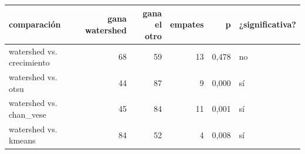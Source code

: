 \begin{tabular}{lrrrrl}
\toprule
comparación & gana watershed & gana el otro & empates & p & ¿significativa? \\
\midrule
watershed vs. crecimiento & 68 & 59 & 13 & 0{,}478 & no \\
watershed vs. otsu & 44 & 87 & 9 & 0{,}000 & sí \\
watershed vs. chan_vese & 45 & 84 & 11 & 0{,}001 & sí \\
watershed vs. kmeans & 84 & 52 & 4 & 0{,}008 & sí \\
\bottomrule
\end{tabular}
